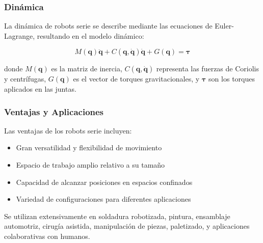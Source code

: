 


\subsubsection{Dinámica}

La dinámica de robots serie se describe mediante las ecuaciones de Euler-Lagrange, resultando en el modelo dinámico:

\begin{equation}
M(\mathbf{q})\ddot{\mathbf{q}} + C(\mathbf{q}, \dot{\mathbf{q}})\dot{\mathbf{q}} + G(\mathbf{q}) = \boldsymbol{\tau}
\end{equation}

donde $M(\mathbf{q})$ es la matriz de inercia, $C(\mathbf{q}, \dot{\mathbf{q}})$ representa las fuerzas de Coriolis y centrífugas, $G(\mathbf{q})$ es el vector de torques gravitacionales, y $\boldsymbol{\tau}$ son los torques aplicados en las juntas.

\subsubsection{Ventajas y Aplicaciones}

Las ventajas de los robots serie incluyen:

\begin{itemize}
    \item Gran versatilidad y flexibilidad de movimiento
    \item Espacio de trabajo amplio relativo a su tamaño
    \item Capacidad de alcanzar posiciones en espacios confinados
    \item Variedad de configuraciones para diferentes aplicaciones
\end{itemize}

Se utilizan extensivamente en soldadura robotizada, pintura, ensamblaje automotriz, cirugía asistida, manipulación de piezas, paletizado, y aplicaciones colaborativas con humanos.
